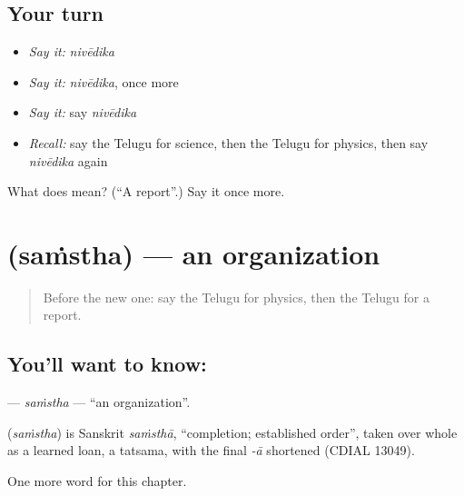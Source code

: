 \subsection*{Your turn}
\begin{itemize}
\raggedright
  \item \emph{Say it:} \emph{nivēdika}
  \item \emph{Say it:} \emph{nivēdika}, once more
  \item \emph{Say it:} say \emph{nivēdika}
  \item \emph{Recall:} say the Telugu for science, then the Telugu for physics, then say \emph{nivēdika} again
\end{itemize}

\begin{tcolorbox}[breakable,colback=teal!4,colframe=teal!35!black,title={Before you move on}]
What does  mean? (\textquotedblleft{}A report\textquotedblright{}.) Say it once more.
\end{tcolorbox}
\section[\texorpdfstring{\te{సంస్థ} (saṁstha)}{సంస్థ (saṁstha)}]{ (saṁstha) — an organization}

\label{lesson:TE-C239-samstha}



\begin{quote}
Before the new one: say the Telugu for physics, then the Telugu for a report.
\end{quote}

\subsection*{You'll want to know: }
\textbf{} — \emph{saṁstha} — \textquotedblleft{}an organization\textquotedblright{}.

\begin{cousinweb}
\textbf{} (\emph{saṁstha}) is Sanskrit \emph{saṁsthā}, \textquotedblleft{}completion; established order\textquotedblright{}, taken over whole as a learned loan, a tatsama, with the final \emph{-ā} shortened (CDIAL 13049).
\end{cousinweb}

\begin{grammarlens}[title={What you've built}]
One more word for this chapter.
\end{grammarlens}

